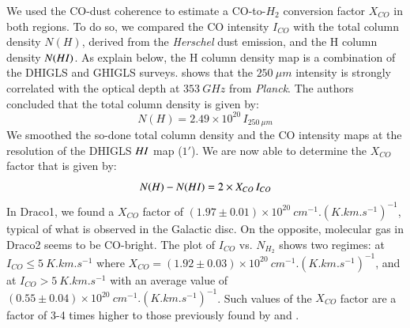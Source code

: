 \documentclass[traditabstract]{aa}
\begin{document}
   We used the CO-dust coherence to estimate a CO-to-$H_2$ conversion factor $X_{CO}$ in both regions. To do so, we compared the CO intensity $I_{CO}$ with the total column density $N(H)$, derived from the \emph{Herschel} dust emission, and the H column density $N(H\rmnum{1})$. As explain below, the H column density map is a combination of the DHIGLS and GHIGLS surveys. \cite{MAMD_2017b} shows that the $250\: \mu m$ intensity is strongly correlated with the optical depth at $353\: GHz$ from \emph{Planck}. The authors concluded that the total column density is given by:
\begin{equation}
  N(H)=2.49\times 10^{20}\, I_{250\: \mu m}
\end{equation}
We smoothed the so-done total column density and the CO intensity maps at the resolution of the DHIGLS $H\rmnum{1}$ map ($1'$). We are now able to determine the $X_{CO}$ factor that is given by:
\begin{equation}
  N(H)-N(H\rmnum{1})=2\times X_{CO}\, I_{CO}
\end{equation}
In Draco1, we found a $X_{CO}$ factor of $(1.97\pm 0.01)\times 10^{20}\: cm^{-1}.(K.km.s^{-1})^{-1}$, typical of what is observed in the Galactic disc\citep{Bolatto_2013}. On the opposite, molecular gas in Draco2 seems to be CO-bright. The plot of $I_{CO}$ vs. $N_{H_2}$ shows two regimes: at $I_{CO}\leq 5\: K.km.s^{-1}$ where $X_{CO}=(1.92\pm 0.03)\times 10^{20}\: cm^{-1}.(K.km.s^{-1})^{-1}$, and at $I_{CO}>5\: K.km.s^{-1}$ with an average value of $(0.55\pm 0.04)\times 10^{20}\: cm^{-1}.(K.km.s^{-1})^{-1}$.
Such values of the $X_{CO}$ factor are a factor of 3-4 times higher to those previously found by \cite{Herbstmeier_1993} and \cite{Moritz_1998}.
\end{document}
